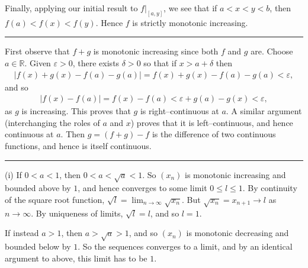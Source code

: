 \documentclass[letterpaper,10pt,english]{jupyterBook}
\begin{document}
Finally, applying our initial result to \(f|_{[a, y]}\), we see that if \(a<x<y<b\), then \(f(a) < f(x) < f(y)\). Hence \(f\) is strictly monotonic increasing.


\bigskip\hrule\bigskip


\sphinxAtStartPar
{\hyperref[\detokenize{Problems:id35}]{}} First observe that \(f+g\) is monotonic increasing since both \(f\) and \(g\) are. Choose \(a \in \mathbb{R}\). Given \(\varepsilon > 0\), there exists \(\delta > 0\) so that if \(x > a + \delta\) then
\begin{equation*}
\begin{split}
|f(x) + g(x) - f(a) - g(a)|  =  f(x) + g(x) - f(a) - g(a) < \varepsilon,
\end{split}
\end{equation*}
\sphinxAtStartPar
and so
\begin{equation*}
\begin{split}
|f(x) - f(a)| = f(x) - f(a) < \varepsilon +g(a) - g(x) < \varepsilon,
\end{split}
\end{equation*}
\sphinxAtStartPar
as \(g\) is increasing. This proves that \(g\) is right–continuous at \(a\). A similar argument (interchanging the roles of \(a\) and \(x\)) proves that it is left–continuous, and hence continuous at \(a\). Then \(g = (f + g) - f\) is the difference of two continuous functions, and hence is itself continuous.


\bigskip\hrule\bigskip


\sphinxAtStartPar
{\hyperref[\detokenize{Problems:id36}]{}}
(i) If \(0<a<1\), then \(0<a<\sqrt{a}<1\). So \((x_n)\) is monotonic increasing and bounded above by \(1\), and hence converges to some limit \(0\leq l\leq 1\). By continuity of the square root function, \(\sqrt{l}=\lim_{n\rightarrow\infty}\sqrt{x_n}\). But \(\sqrt{x_n}=x_{n+1}\rightarrow l\) as \(n\rightarrow\infty\). By uniqueness of limits, \(\sqrt{l}=l\), and so \(l=1\).

If instead \(a>1\), then \(a>\sqrt{a}>1\), and so \((x_n)\) is monotonic decreasing and bounded below by \(1\). So the sequences converges to a limit, and by an identical argument to above, this limit has to be \(1\).
\end{document}
